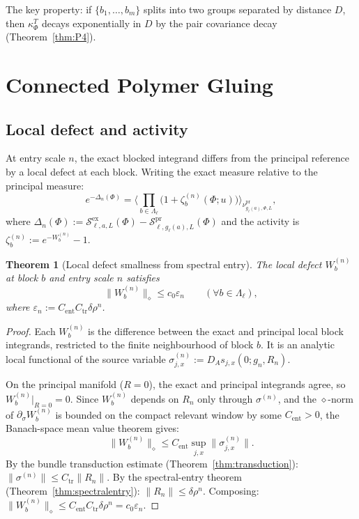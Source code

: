 \documentclass[12pt]{article}
\theoremstyle{plain}
\newtheorem{theorem}{Theorem}[section]
\theoremstyle{definition}
\numberwithin{equation}{section}
\newcommand{\pr}{\mathrm{pr}}
\newcommand{\ex}{\mathrm{ex}}
\newcommand{\tr}{\mathrm{tr}}
\begin{document}
The key property: if $\{b_1,\ldots,b_m\}$ splits into two groups separated by distance $D$, then $\kappa_\Phi^T$ decays exponentially in $D$ by the pair covariance decay (Theorem~\ref{thm:P4}).


\section{Connected Polymer Gluing}\label{sec:polymer}

\subsection{Local defect and activity}

At entry scale $n$, the exact blocked integrand differs from the principal reference by a local defect at each block.  Writing the exact measure relative to the principal measure:
\begin{equation}
e^{-\Delta_n(\Phi)} = \Big\langle\prod_{b\in\Lambda_\ell}\bigl(1+\zeta_b^{(n)}(\Phi;u)\bigr)\Big\rangle_{\nu^{\pr}_{g_\ell(a),\Phi,L}},
\end{equation}
where $\Delta_n(\Phi):=\mathcal{S}^{\ex}_{\ell,a,L}(\Phi)-\mathcal{S}^{\pr}_{\ell,g_\ell(a),L}(\Phi)$ and the activity is $\zeta_b^{(n)}:=e^{-W_b^{(n)}}-1$.

\begin{theorem}[Local defect smallness from spectral entry]\label{thm:defectsmall}
The local defect $W_b^{(n)}$ at block $b$ and entry scale $n$ satisfies
\begin{equation}
\|W_b^{(n)}\|_\diamond \leq c_0\varepsilon_n \qquad(\forall b\in\Lambda_\ell),
\end{equation}
where $\varepsilon_n:=C_{\mathrm{ent}}C_{\tr}\delta\rho^n$.
\end{theorem}

\begin{proof}
Each $W_b^{(n)}$ is the difference between the exact and principal local block integrands, restricted to the finite neighbourhood of block $b$.  It is an analytic local functional of the source variable $\sigma_{j,x}^{(n)}:=D_A s_{j,x}(0;g_n,R_n)$.

On the principal manifold ($R=0$), the exact and principal integrands agree, so $W_b^{(n)}|_{R=0}=0$.  Since $W_b^{(n)}$ depends on $R_n$ only through $\sigma^{(n)}$, and the $\diamond$-norm of $\partial_\sigma W_b^{(n)}$ is bounded on the compact relevant window by some $C_{\mathrm{ent}}>0$, the Banach-space mean value theorem gives:
\begin{equation}
\|W_b^{(n)}\|_\diamond \leq C_{\mathrm{ent}}\sup_{j,x}\|\sigma_{j,x}^{(n)}\|.
\end{equation}
By the bundle transduction estimate (Theorem~\ref{thm:transduction}): $\|\sigma^{(n)}\|\leq C_{\tr}\|R_n\|$.  By the spectral-entry theorem (Theorem~\ref{thm:spectralentry}): $\|R_n\|\leq\delta\rho^n$.  Composing: $\|W_b^{(n)}\|_\diamond\leq C_{\mathrm{ent}}C_{\tr}\delta\rho^n=c_0\varepsilon_n$.
\end{proof}
\end{document}
